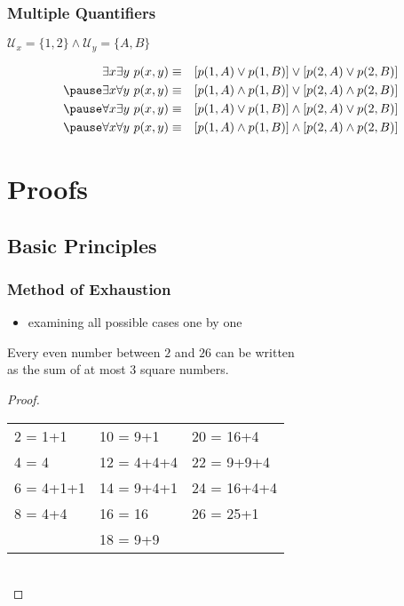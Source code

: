 \documentclass[dvipsnames]{beamer}
\begin{document}
\begin{frame}
  \frametitle{Multiple Quantifiers}

  \begin{example}
    $\mathcal{U}_x = \{1,2\} \wedge \mathcal{U}_y = \{A,B\}$

    \pause
    \begin{eqnarray*}
      \exists x \exists y~p(x,y) & \equiv & [p(1,A) \vee p(1,B)]
                                       \vee [p(2,A) \vee p(2,B)]\\\pause
      \exists x \forall y~p(x,y) & \equiv & [p(1,A) \wedge p(1,B)]
                                       \vee [p(2,A) \wedge p(2,B)]\\\pause
      \forall x \exists y~p(x,y) & \equiv & [p(1,A) \vee p(1,B)]
                                     \wedge [p(2,A) \vee p(2,B)]\\\pause
      \forall x \forall y~p(x,y) & \equiv & [p(1,A) \wedge p(1,B)]
                                     \wedge [p(2,A) \wedge p(2,B)]
    \end{eqnarray*}
  \end{example}
\end{frame}

\section{Proofs}

\subsection{Basic Principles}

\begin{frame}
  \frametitle{Method of Exhaustion}

  \begin{itemize}
    \item examining all possible cases one by one
  \end{itemize}

  \pause
  \begin{theorem}
    Every even number between $2$ and $26$ can be written\\
    as the sum of at most 3 square numbers.
  \end{theorem}

  \pause
  \begin{proof}
    \begin{tabular}{lll}
      2 = 1+1   & 10 = 9+1    & 20 = 16+4\\
      4 = 4     & 12 = 4+4+4  & 22 = 9+9+4\\
      6 = 4+1+1 & 14 = 9+4+1  & 24 = 16+4+4\\
      8 = 4+4   & 16 = 16     & 26 = 25+1\\
                & 18 = 9+9    &
    \end{tabular}\\
  \end{proof}
\end{frame}
\end{document}
